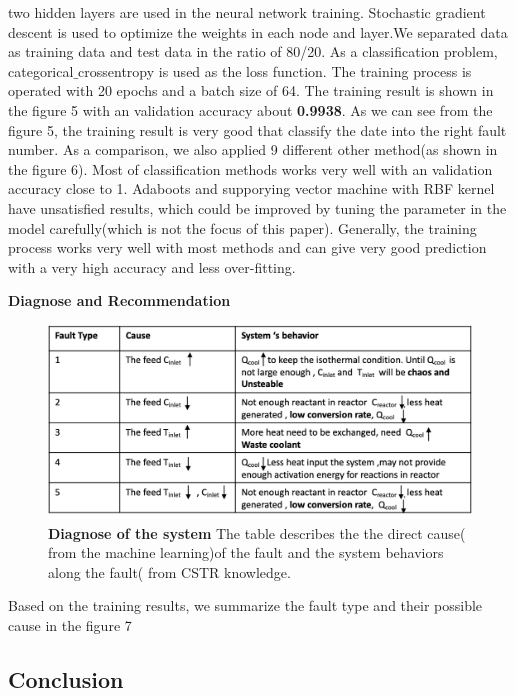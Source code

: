 \documentclass[fleqn,11pt]{wlscirep}
\begin{document}
two hidden layers are used in the neural network training. Stochastic gradient descent is used to optimize the weights in each node and layer.We separated data as training data and test data in the ratio of 80/20.  As a classification problem, categorical$\_$crossentropy is used as the loss function. The training process is operated with 20 epochs and a batch size of 64. The training  result is shown in the figure 5 with an validation accuracy about \textbf{0.9938}. As we can see from the figure 5, the  training result is very good that classify the date into the right fault number. As a comparison, we also applied 9 different other method(as shown in the figure 6). Most of classification methods works very well with an validation accuracy close to 1. Adaboots and supporying vector machine with RBF kernel have unsatisfied results, which could be improved by tuning the parameter in the model carefully(which is not the focus of this paper). Generally, the training process works very well with most  methods and can give very good prediction with a very high accuracy and less over-fitting.


\textbf{Diagnose and Recommendation }
\begin{figure}[h]
    \centering
    \includegraphics[width=12cm]{figure7.png}
    \caption{
    \textbf{Diagnose  of the system} The table describes the the direct cause( from the machine learning)of the fault and the system behaviors along the fault( from CSTR knowledge.  }
    \label{fig:1}
\end{figure}

Based on the training results, we summarize the fault type and their possible cause in the figure 7

 
\subsection*{Conclusion}


\end{document}
